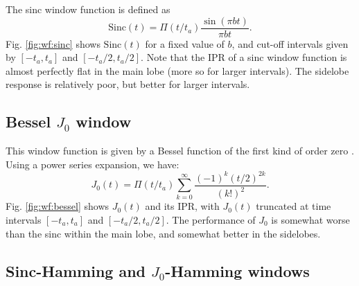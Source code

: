 \documentclass[useAMS,usenatbib]{mn2e}
\begin{document}

The sinc window function is defined as 
\begin{equation}
\mathrm{Sinc}(t)= \Pi(t/t_a) \frac{\sin(\pi b t)}{\pi b t} .
\end{equation}
Fig. \ref{fig:wf:sinc} shows $\mathrm{Sinc}(t)$ for a fixed value of $b$, and cut-off intervals given 
by $[-t_a,t_a]$ and $[-t_a/2,t_a/2]$. Note that the IPR of a sinc window function is almost perfectly flat in the main lobe (more so for larger intervals). The sidelobe response is relatively poor, but better for larger intervals.

\subsection{Bessel $J_0$ window}
\label{Bessel}

This window function is given by a Bessel function of the first kind of order zero \citep{watson1995treatise}. Using a power series expansion, we have:
\begin{equation}
J_0(t) = \Pi(t/t_a) \sum_{k=0}^{\infty}\frac{(-1)^k (t/2)^{2k}}{(k!)^2}.
\end{equation}
Fig. \ref{fig:wf:bessel} shows $J_0(t)$ and its IPR, with $J_0(t)$ truncated at time intervals $[-t_a,t_a]$ and 
$[-t_a/2,t_a/2]$. The performance of $J_0$ is somewhat worse than the sinc within the main lobe, and somewhat better in
the sidelobes.
\subsection{Sinc-Hamming and $J_0$-Hamming windows}
\end{document}
